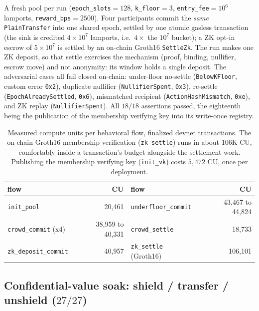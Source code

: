 \documentclass[10pt]{article}
\newcommand{\code}[1]{\texttt{#1}}
\begin{document}
A fresh pool per run (\code{epoch\_slots}$=128$, \code{k\_floor}$=3$,
\code{entry\_fee}$=10^6$ lamports, \code{reward\_bps}$=2500$). Four participants
commit the \emph{same} \code{PlainTransfer} into one shared epoch, settled by one
atomic gasless transaction (the sink is credited $4\times10^7$ lamports, i.e.\
$4\times$ the $10^7$ bucket); a ZK opt-in escrow of $5\times10^7$ is settled by an
on-chain Groth16 \code{SettleZk}. The run makes one ZK deposit, so that settle
exercises the mechanism (proof, binding, nullifier, escrow move) and not
anonymity: its window holds a single deposit. The adversarial cases all
fail closed on-chain: under-floor no-settle (\code{BelowKFloor}, custom error
\code{0x2}), duplicate nullifier (\code{NullifierSpent}, \code{0x3}), re-settle
(\code{EpochAlreadySettled}, \code{0x6}), mismatched recipient
(\code{ActionHashMismatch}, \code{0xe}), and ZK replay (\code{NullifierSpent}).
All $18/18$ assertions passed, the eighteenth being the publication of the
membership verifying key into its write-once registry.

\begin{table}[h]
\centering
\small
\begin{tabular}{@{}lr@{\hskip 2.2em}lr@{}}
\toprule
\textbf{flow} & \textbf{CU} & \textbf{flow} & \textbf{CU} \\
\midrule
\code{init\_pool}          & 20{,}461 & \code{underfloor\_commit}   & 43{,}467 to 44{,}824 \\
\code{crowd\_commit} (x4)  & 38{,}959 to 40{,}331 & \code{crowd\_settle}        & 18{,}733 \\
\code{zk\_deposit\_commit} & 40{,}957 & \code{zk\_settle} (Groth16) & 106{,}101 \\
\bottomrule
\end{tabular}
\caption{Measured compute units per behavioral flow, finalized devnet
transactions. The on-chain Groth16 membership verification (\code{zk\_settle})
runs in about 106K CU, comfortably inside a transaction's budget alongside the
settlement work. Publishing the membership verifying key (\code{init\_vk}) costs
$5{,}472$ CU, once per deployment.}
\end{table}

\subsection{Confidential-value soak: shield / transfer / unshield ($27/27$)}
\end{document}
